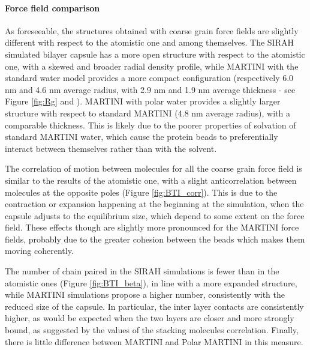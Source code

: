 \paragraph{Force field comparison}
As foreseeable, the structures obtained with coarse grain force fields are slightly different with respect to the atomistic one and among themselves.
%
The SIRAH simulated bilayer capsule has a more open structure with respect to the atomistic one, with a skewed and broader radial density profile, while MARTINI with the standard water model provides a more compact configuration (respectively 6.0 nm and 4.6 nm average radius, with 2.9 nm and 1.9 nm average thickness - see Figure \ref{fig:Rg} and ). MARTINI with polar water provides a slightly larger structure with respect to standard MARTINI (4.8 nm average radius), with a comparable thickness. This is likely due to the poorer properties of solvation of standard MARTINI water, which cause the protein beads to preferentially interact between themselves rather than with the solvent. 

The correlation of motion between molecules for all the coarse grain force field is similar to the results of the atomistic one, with a slight anticorrelation between molecules at the opposite poles (Figure \ref{fig:BTI_corr}). This is due to the contraction or expansion happening at the beginning at the simulation, when the capsule adjusts to the equilibrium size, which depend to some extent on the force field.
%
These effects though are slightly more pronounced for the MARTINI force fields, probably due to the greater cohesion between the beads which makes them moving coherently.

The number of chain paired in the SIRAH simulations is fewer than in the atomistic ones (Figure \ref{fig:BTI_beta}), in line with a more expanded structure, while MARTINI simulations propose a higher number, consistently with the reduced size of the capsule. In particular, the inter layer contacts are consistently higher, as would be expected when the two layers are closer and more strongly bound, as suggested by the values of the stacking molecules correlation. Finally, there is little difference between MARTINI and Polar MARTINI in this measure.

